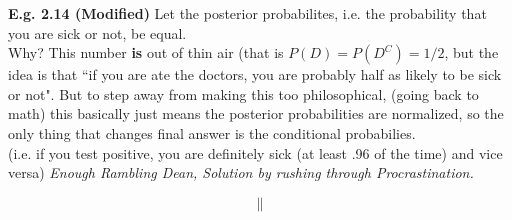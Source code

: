 \documentclass[12pt]{book}
\begin{document}
\textbf{E.g. 2.14 (Modified)} Let the posterior probabilites, i.e. the probability that you are sick or not, be equal. \\

Why? This number \textbf{is} out of thin air (that is $P(D)=P(D^C)=1/2$, but the idea is that ``if you are ate the doctors, you are probably half as likely to be sick or not". But to step away from making this too philosophical, (going back to math) this basically just means the posterior probabilities are normalized, so the only thing that changes final answer is the conditional probabilies. \\

(i.e. if you test positive, you are definitely sick \scriptsize{(at least .96 of the time)} \normalsize and vice versa)
\newpage
\noindent \textit{Enough Rambling Dean, Solution by rushing through Procrastination.}\\
\begin{center}
\end{center}
$$\parallel$$
\begin{center}
\end{center}
\end{document}
